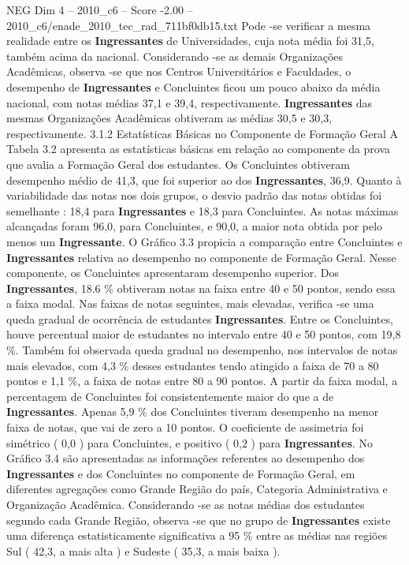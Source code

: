 \begin{textsample}{NEG Dim 4 – 2010\_c6 – Score -2.00 – 2010\_c6/enade\_2010\_tec\_rad\_711bf0db15.txt}
Pode -se verificar a mesma realidade entre os \textbf{Ingressantes} de Universidades, cuja nota média foi 31,5, também acima da nacional.
Considerando -se as demais Organizações Acadêmicas, observa -se que nos Centros Universitários e Faculdades, o desempenho de \textbf{Ingressantes} e Concluintes ficou um pouco abaixo da média nacional, com notas médias 37,1 e 39,4, respectivamente. \textbf{Ingressantes} das mesmas Organizações Acadêmicas obtiveram as médias 30,5 e 30,3, respectivamente. 3.1.2 Estatísticas Básicas no Componente de Formação Geral A Tabela 3.2 apresenta as estatísticas básicas em relação ao componente da prova que avalia a Formação Geral dos estudantes.
Os Concluintes obtiveram desempenho médio de 41,3, que foi superior ao dos \textbf{Ingressantes}, 36,9.
Quanto à variabilidade das notas nos dois grupos, o desvio padrão das notas obtidas foi semelhante : 18,4 para \textbf{Ingressantes} e 18,3 para Concluintes.
As notas máximas alcançadas foram 96,0, para Concluintes, e 90,0, a maior nota obtida por pelo menos um \textbf{Ingressante}.
O Gráfico 3.3 propicia a comparação entre Concluintes e \textbf{Ingressantes} relativa ao desempenho no componente de Formação Geral.
Nesse componente, os Concluintes apresentaram desempenho superior.
Dos \textbf{Ingressantes}, 18.6 \% obtiveram notas na faixa entre 40 e 50 pontos, sendo essa a faixa modal.
Nas faixas de notas seguintes, mais elevadas, verifica -se uma queda gradual de ocorrência de estudantes \textbf{Ingressantes}.
Entre os Concluintes, houve percentual maior de estudantes no intervalo entre 40 e 50 pontos, com 19,8 \%.
Também foi observada queda gradual no desempenho, nos intervalos de notas mais elevados, com 4,3 \% desses estudantes tendo atingido a faixa de 70 a 80 pontos e 1,1 \%, a faixa de notas entre 80 a 90 pontos.
A partir da faixa modal, a percentagem de Concluintes foi consistentemente maior do que a de \textbf{Ingressantes}.
Apenas 5,9 \% dos Concluintes tiveram desempenho na menor faixa de notas, que vai de zero a 10 pontos.
O coeficiente de assimetria foi simétrico ( 0,0 ) para Concluintes, e positivo ( 0,2 ) para \textbf{Ingressantes}.
No Gráfico 3.4 são apresentadas as informações referentes ao desempenho dos \textbf{Ingressantes} e dos Concluintes no componente de Formação Geral, em diferentes agregações como Grande Região do país, Categoria Administrativa e Organização Acadêmica.
Considerando -se as notas médias dos estudantes segundo cada Grande Região, observa -se que no grupo de \textbf{Ingressantes} existe uma diferença estatisticamente significativa a 95 \% entre as médias nas regiões Sul ( 42,3, a mais alta ) e Sudeste ( 35,3, a mais baixa ).

\end{textsample}
